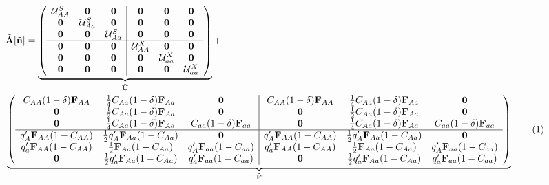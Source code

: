 \documentclass[11pt]{article}
\newcommand\numberthis{\addtocounter{equation}{1}\tag{\theequation}}
\def\mbf#1{\mathbf{#1}}
\def\mcal#1{\mathcal{#1}}
\begin{document}
\begin{align*}
	&\tilde{\mbf{A}}[\tilde{\mbf{n}}] = 
		 \underbrace{\left(
			\begin{array}{ccc|ccc}
				\mcal{U}^S_{AA} & \mbf{0} & \mbf{0} & \mbf{0} & \mbf{0} & \mbf{0} \\ 
				\mbf{0} & \mcal{U}^S_{Aa} & \mbf{0} & \mbf{0} & \mbf{0} & \mbf{0} \\
				\mbf{0} & \mbf{0} & \mcal{U}^S_{Aa} & \mbf{0} & \mbf{0} & \mbf{0} \\ \hline
				\mbf{0} & \mbf{0} & \mbf{0} & \mcal{U}^X_{AA} & \mbf{0} & \mbf{0} \\
				\mbf{0} & \mbf{0} & \mbf{0} & \mbf{0} & \mcal{U}^X_{aa} & \mbf{0}\\
				\mbf{0} & \mbf{0} & \mbf{0} & \mbf{0} & \mbf{0} & \mcal{U}^X_{aa}
			\end{array} \right)}_{\tilde{\mbf{U}}} + \\ 
	&\underbrace{\left(
			\begin{array}{ccc|ccc}
				C_{AA} (1 - \delta) \mbf{F}_{AA} & \frac{1}{4} C_{Aa} (1 - \delta) \mbf{F}_{Aa} & \mbf{0} & C_{AA} (1 - \delta) \mbf{F}_{AA} & \frac{1}{4} C_{Aa} (1 - \delta) \mbf{F}_{Aa} & \mbf{0} \\ 
				\mbf{0} & \frac{1}{2} C_{Aa} (1 - \delta) \mbf{F}_{Aa} & \mbf{0} & \mbf{0} & \frac{1}{2} C_{Aa} (1 - \delta) \mbf{F}_{Aa} & \mbf{0}  \\
				\mbf{0} & \frac{1}{4} C_{Aa} (1 - \delta) \mbf{F}_{Aa} & C_{aa} (1 - \delta) \mbf{F}_{aa} & \mbf{0} & \frac{1}{4} C_{Aa} (1 - \delta) \mbf{F}_{Aa} & C_{aa} (1 - \delta) \mbf{F}_{aa} \\ \hline
				q^{\prime}_{A} \mbf{F}_{AA} (1 - C_{AA})& \frac{1}{2} q^{\prime}_{A} \mbf{F}_{Aa} (1 - C_{Aa}) & \mbf{0} & q^{\prime}_{A} \mbf{F}_{AA} (1 - C_{AA})& \frac{1}{2} q^{\prime}_{A} \mbf{F}_{Aa} (1 - C_{Aa}) & \mbf{0} \\
				q^{\prime}_{a} \mbf{F}_{AA} (1 - C_{AA}) & \frac{1}{2} \mbf{F}_{Aa} (1 - C_{Aa}) & q^{\prime}_{A} \mbf{F}_{aa} (1 - C_{aa}) & q^{\prime}_{a} \mbf{F}_{AA} (1 - C_{AA}) & \frac{1}{2} \mbf{F}_{Aa} (1 - C_{Aa}) & q^{\prime}_{A} \mbf{F}_{aa} (1 - C_{aa}) \\
				\mbf{0} & \frac{1}{2} q^{\prime}_{a} \mbf{F}_{Aa} (1 - C_{Aa})& q^{\prime}_{a} \mbf{F}_{aa} (1 - C_{aa}) & \mbf{0} & \frac{1}{2} q^{\prime}_{a} \mbf{F}_{Aa} (1 - C_{Aa})& q^{\prime}_{a} \mbf{F}_{aa} (1 - C_{aa})
			\end{array} \right)}_{\tilde{\mbf{F}}} \numberthis
\end{align*}
\end{document}
